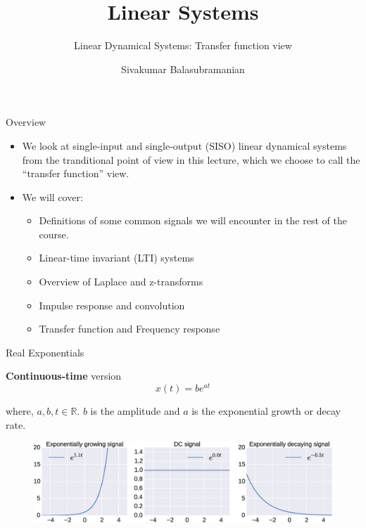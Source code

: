 \documentclass[aspectratio=169]{beamer}
\title{Linear Systems}
\subtitle{Linear Dynamical Systems: Transfer function view}
\author{Sivakumar Balasubramanian}
\institute[Christian Medical College] %
{
  \inst{}%
  Department of Bioengineering\\
  Christian Medical College, Bagayam\\
  Vellore 632002
}
\date{}
\begin{document}

\begin{frame}
  \titlepage
\end{frame}

\begin{frame}{Overview}
\begin{itemize}
    \item We look at single-input and single-output (SISO) linear dynamical systems from the tranditional point of view in this lecture, which we choose to call the ``transfer function'' view.
    \item We will cover: 
    \begin{itemize}
        \item Definitions of some common signals we will encounter in the rest of the course.
        \item Linear-time invariant (LTI) systems
        \item Overview of Laplace and z-transforms
        \item Impulse response and convolution
        \item Transfer function and Frequency response
    \end{itemize} 
\end{itemize}
\end{frame}

\begin{frame}{Real Exponentials}

\textbf{Continuous-time} version
\[ x(t) = be^{at} \]

where, $a, b, t \in \mathbb{R}$. $b$ is the amplitude and $a$ is the exponential growth or decay rate.

\begin{figure}
\includegraphics[width=\textwidth]{img/exp.eps}
\end{figure}
\end{frame}
\end{document}
